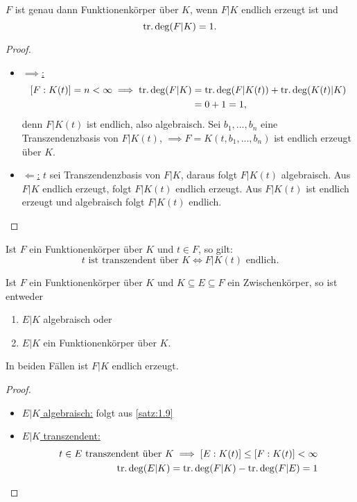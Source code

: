 \begin{satz}
    $F$ ist genau dann Funktionenkörper über $K$, wenn $F|K$ endlich erzeugt ist und 
    $$ \operatorname{tr.deg}(F|K) = 1. $$
\end{satz}
\begin{proof}
    \begin{itemize}[label=]
        \item \underline{$\implies$:}
        \begin{align*}
            \left[F:K(t)\right] = n < \infty \implies \operatorname{tr.deg}(F|K) & = \operatorname{tr.deg}(F|K(t)) + \operatorname{tr.deg}(K(t)|K)\\
            & = 0 + 1 = 1,
        \end{align*}
        denn $F|K(t)$ ist endlich, also algebraisch.
        Sei $b_1,...,b_n$ eine Transzendenzbasis von $F|K(t)$, $\implies F=K(t, b_1,...,b_n)$ ist endlich erzeugt über $K$. 
        \item \underline{$\Longleftarrow$:}
        $t$ sei Transzendenzbasis von $F|K$, daraus folgt $F|K(t)$ algebraisch.
        Aus $F|K$ endlich erzeugt, folgt $F|K(t)$ endlich erzeugt.
        Aus $F|K(t)$ ist endlich erzeugt und algebraisch folgt $F|K(t)$ endlich.
    \end{itemize}
\end{proof}

\begin{korollar}
    Ist $F$ ein Funktionenkörper über $K$ und $t \in F$, so gilt:
    $$ t \text{ ist transzendent über } K \iff F|K(t) \text{ endlich}.$$ 
\end{korollar}
\begin{korollar}\label{korollar:1.20}
    Ist $F$ ein Funktionenkörper über $K$ und $K \subseteq E \subseteq F$ ein Zwischenkörper, so ist entweder
    \begin{enumerate}[label=(\arabic*)]
        \item $E|K$ algebraisch oder
        \item $E|K$ ein Funktionenkörper über $K$.
    \end{enumerate}
    In beiden Fällen ist $F|K$ endlich erzeugt.
\end{korollar}
\begin{proof}
    \begin{itemize}[label=]
        \item \underline{$E|K$ algebraisch:}
        folgt aus \cref{satz:1.9}
        \item \underline{$E|K$ transzendent:}
        \begin{align*}
            t \in E \text{ transzendent über } K \implies [E:K(t)] \leq [F:K(t)] < \infty\\
            \operatorname{tr.deg}(E|K) = \operatorname{tr.deg}(F|K) - \operatorname{tr.deg}(F|E) = 1
        \end{align*}
    \end{itemize}
\end{proof}

